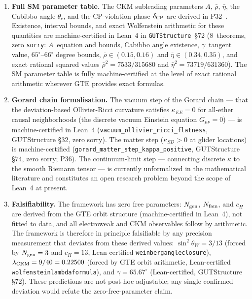 \documentclass[11pt]{article}
\theoremstyle{remark}
\newcommand{\lean}[1]{%
  \penalty-100
  \begingroup\def\_{\textunderscore\allowbreak}\texttt{#1}\endgroup}
\begin{document}
\begin{enumerate}
  \item \textbf{Full SM parameter table.}
    The CKM subleading parameters $A$, $\bar\rho$, $\bar\eta$, the Cabibbo angle
    $\theta_c$, and the CP-violation phase $\delta_{\rm CP}$ are derived in
    P32~\cite{SpivackCKM}.
    Existence, interval bounds, and exact Wolfenstein arithmetic for these quantities
    are machine-certified in Lean~4 in \texttt{GUTStructure}~\S72
    (8~theorems, zero \texttt{sorry}: $A$~equation and bounds, Cabibbo angle existence,
    $\gamma$~tangent value, $65^\circ$--$66^\circ$ degree bounds,
    $\bar\rho\!\in\!(0.15,0.16)$ and $\bar\eta\!\in\!(0.34,0.35)$,
    and exact rational squared values $\bar\rho^2 = 7533/315680$ and
    $\bar\eta^2 = 73719/631360$).
    The SM parameter table is fully machine-certified at the level of
    exact rational arithmetic wherever GTE provides exact formulas.

  \item \textbf{Gorard chain formalisation.}
    The vacuum step of the Gorard chain --- that the deviation-based Ollivier-Ricci
    curvature satisfies $\kappa_{EE} = 0$ for all-ether causal neighborhoods (the
    discrete vacuum Einstein equation $G_{\mu\nu}=0$) --- is machine-certified
    in Lean~4 (\texttt{vacuum\_ollivier\_ricci\_flatness}, GUTStructure §32, zero
    sorry).  The matter step ($\kappa_{SD} > 0$ at glider locations) is machine-certified
    (\texttt{gorard\_matter\_step\_kappa\_positive},
    GUTStructure §74, zero sorry; P36).
    The continuum-limit step --- connecting discrete $\kappa$ to the smooth Riemann
    tensor --- is currently unformalized in the mathematical literature and constitutes
    an open research problem beyond the scope of Lean~4 at present.

  \item \textbf{Falsifiability.}
    The framework has zero free parameters: $N_{\rm gen}$, $N_{\rm fam}$, and
    $c_H$ are derived from the GTE orbit structure (machine-certified in Lean~4), not fitted to data,
    and all electroweak and CKM observables follow by arithmetic.
    The framework is therefore in principle falsifiable by any precision measurement
    that deviates from these derived values:
    $\sin^2\!\theta_W = 3/13$ (forced by $N_{\rm gen} = 3$ and $c_H = 13$,
    Lean-certified \lean{weinberg\_angle\_closure}),
    $\lambda_{\rm CKM} = 9/40 = 0.22500$ (forced by GTE orbit arithmetic,
    Lean-certified \lean{wolfenstein\_lambda\_formula}),
    and $\gamma = 65.67^\circ$ (Lean-certified, GUTStructure \S72).
    These predictions are not post-hoc adjustable; any single confirmed
    deviation would refute the zero-free-parameter claim.
\end{enumerate}
\end{document}
